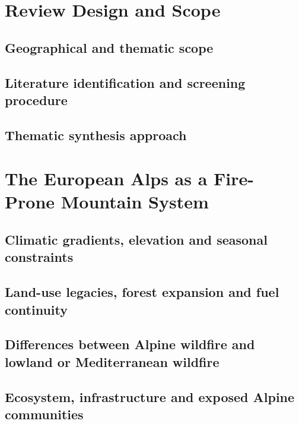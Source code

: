 \documentclass[11pt,a4paper]{article}
\begin{document}
\section{Review Design and Scope}

\subsection{Geographical and thematic scope}

\subsection{Literature identification and screening procedure}

\subsection{Thematic synthesis approach}


\section{The European Alps as a Fire-Prone Mountain System}

\subsection{Climatic gradients, elevation and seasonal constraints}

\subsection{Land-use legacies, forest expansion and fuel continuity}

\subsection{Differences between Alpine wildfire and lowland or Mediterranean wildfire}

\subsection{Ecosystem, infrastructure and exposed Alpine communities}


\end{document}
